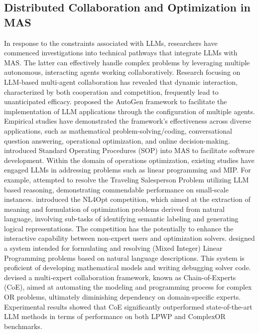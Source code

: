 \documentclass[preprint,12pt]{elsarticle}
\begin{document}
\subsection{Distributed Collaboration and Optimization in MAS}

In response to the constraints associated with LLMs, researchers have commenced investigations into technical pathways that integrate LLMs with MAS. The latter can effectively handle complex problems by leveraging multiple autonomous, interacting agents working collaboratively. Research focusing on LLM-based multi-agent collaboration has revealed that dynamic interaction, characterized by both cooperation and competition, frequently lead to unanticipated efficacy. \cite{wuAutoGenEnablingNextGen2023a} proposed the AutoGen framework to facilitate the implementation of LLM applications through the configuration of multiple agents. Empirical studies have demonstrated the framework's effectiveness across diverse applications, such as mathematical problem-solving/coding, conversational question answering, operational optimization, and online decision-making. \cite{hongMetaGPTMetaProgramming2024d} introduced Standard Operating Procedures (SOP) into MAS to facilitate software development. Within the domain of operations optimization, existing studies have engaged LLMs in addressing problems such as linear programming and MIP. For example, \cite{zhangNeuralTSPSolver2023} attempted to resolve the Traveling Salesperson Problem utilizing LLM based reasoning, demonstrating commendable performance on small-scale instances. \cite{ramamonjisonNL4OptCompetitionFormulating2023} introduced the NL4Opt competition, which aimed at the extraction of meaning and formulation of optimization problems derived from natural language, involving sub-tasks of identifying semantic labeling and generating logical representations. The competition has the potentially to enhance the interactive capability between non-expert users and optimization solvers. \cite{ahmaditeshniziOptiMUSScalableOptimization2024} designed a system intended for formulating and resolving (Mixed Integer) Linear Programming problems based on natural language descriptions. This system is proficient of developing mathematical models and writing debugging solver code. \cite{xiaoChainofExpertsWhenLLMs2024} devised a multi-expert collaboration framework, known as Chain-of-Experts (CoE), aimed at automating the modeling and programming process for complex OR problems, ultimately diminishing dependency on domain-specific experts. Experimental results showed that CoE significantly outperformed state-of-the-art LLM methods in terms of performance on both LPWP and ComplexOR benchmarks.
\end{document}

